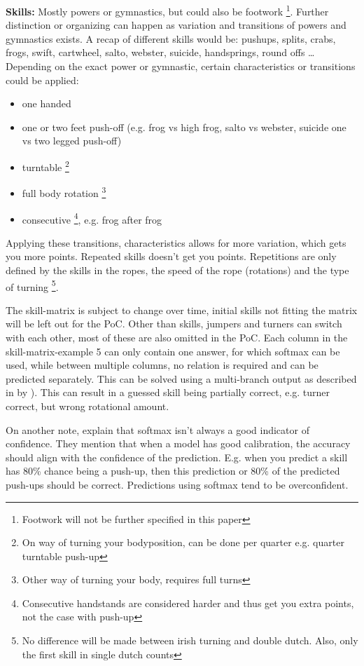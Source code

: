 \textbf{Skills:} Mostly powers or gymnastics, but could also be footwork \footnote{Footwork will not be further specified in this paper}. Further distinction or organizing can happen as variation and transitions of powers and gymnastics exists. A recap of different skills would be: pushups, splits, crabs, frogs, swift, cartwheel, salto, webster, suicide, handsprings, round offs \dots %
Depending on the exact power or gymnastic, certain characteristics or transitions could be applied:

\begin{itemize}
    \item one handed
    \item one or two feet push-off (e.g. frog vs high frog, salto vs webster, suicide one vs two legged push-off)
    \item turntable \footnote{On way of turning your bodyposition, can be done per quarter e.g. quarter turntable push-up}
    \item full body rotation \footnote{Other way of turning your body, requires full turns}
    \item consecutive \footnote{Consecutive handstands are considered harder and thus get you extra points, not the case with push-up}, e.g. frog after frog
\end{itemize}

Applying these transitions, characteristics allows for more variation, which gets you more points. Repeated skills doesn't get you points. Repetitions are only defined by the skills in the ropes, the speed of the rope (rotations) and the type of turning \footnote{No difference will be made between irish turning and double dutch. Also, only the first skill in single dutch counts}.

\medskip

The skill-matrix is subject to change over time, initial skills not fitting the matrix will be left out for the PoC. Other than skills, jumpers and turners can switch with each other, most of these are also omitted in the PoC.
Each column in the skill-matrix-example 5 can only contain one answer, for which softmax can be used, while between multiple columns, no relation is required and can be predicted separately. This can be solved using a multi-branch output as described in by \autocite{Coulibaly_2022}). This can result in a guessed skill being partially correct, e.g. turner correct, but wrong rotational amount.

On another note, \textcite{Guo_2017} explain that softmax isn't always a good indicator of confidence. They mention that when a model has good calibration, the accuracy should align with the confidence of the prediction. E.g. when you predict a skill has 80\% chance being a push-up, then this prediction or 80\% of the predicted push-ups should be correct. Predictions using softmax tend to be overconfident.

